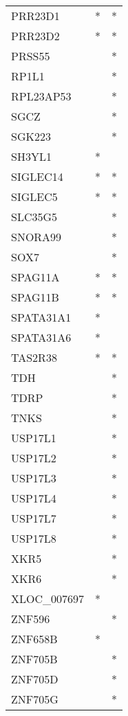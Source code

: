 \begin{longtable}{lcc}
PRR23D1      &              * &          * \\
PRR23D2      &              * &          * \\
PRSS55       &                &          * \\
RP1L1        &                &          * \\
RPL23AP53    &                &          * \\
SGCZ         &                &          * \\
SGK223       &                &          * \\
SH3YL1       &              * &            \\
SIGLEC14     &              * &          * \\
SIGLEC5      &              * &          * \\
SLC35G5      &                &          * \\
SNORA99      &                &          * \\
SOX7         &                &          * \\
SPAG11A      &              * &          * \\
SPAG11B      &              * &          * \\
SPATA31A1    &              * &            \\
SPATA31A6    &              * &            \\
TAS2R38      &              * &          * \\
TDH          &                &          * \\
TDRP         &                &          * \\
TNKS         &                &          * \\
USP17L1      &                &          * \\
USP17L2      &                &          * \\
USP17L3      &                &          * \\
USP17L4      &                &          * \\
USP17L7      &                &          * \\
USP17L8      &                &          * \\
XKR5         &                &          * \\
XKR6         &                &          * \\
XLOC\_007697  &              * &            \\
ZNF596       &                &          * \\
ZNF658B      &              * &            \\
ZNF705B      &                &          * \\
ZNF705D      &                &          * \\
ZNF705G      &                &          * \\
\end{longtable}
